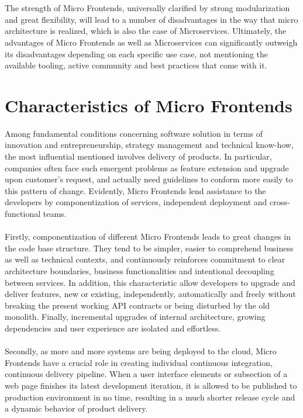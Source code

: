 \documentclass[a4paper]{book}
\begin{document}
\\ \\
The strength of Micro Frontends, universally clarified by strong modularization and great flexibility, will lead to a number of disadvantages in the way that micro architecture is realized, which is also the case of Microservices. Ultimately, the advantages of Micro Frontends as well as Microservices can significantly outweigh its disadvantages depending on each specific use case, not mentioning the available tooling, active community and best practices that come with it. 

\section{Characteristics of Micro Frontends}
Among fundamental conditions concerning software solution in terms of innovation and entrepreneurship, strategy management and technical know-how, the most influential mentioned involves delivery of products. In particular, companies often face such emergent problems as feature extension and upgrade upon customer's request, and actually need guidelines to conform more easily to this pattern of change. Evidently, Micro Frontends lend assistance to the developers by componentization of services, independent deployment and cross-functional teams.
\\ \\
Firstly, componentization of different Micro Frontends leads to great changes in the code base structure. They tend to be simpler, easier to comprehend business as well as technical contexts, and continuously reinforces commitment to clear architecture boundaries, business functionalities and intentional decoupling between services. In addition, this characteristic allow developers to upgrade and deliver features, new or existing, independently, automatically and freely without breaking the present working API contracts or being disturbed by the old monolith. Finally, incremental upgrades of internal architecture, growing dependencies and user experience are isolated and effortless.
\\ \\
Secondly, as more and more systems are being deployed to the cloud, Micro Frontends have a crucial role in creating individual continuous integration, continuous delivery pipeline. When a user interface elements or subsection of a web page finishes its latest development iteration, it is allowed to be published to production environment in no time, resulting in a much shorter release cycle and a dynamic behavior of product delivery. 
\end{document}
